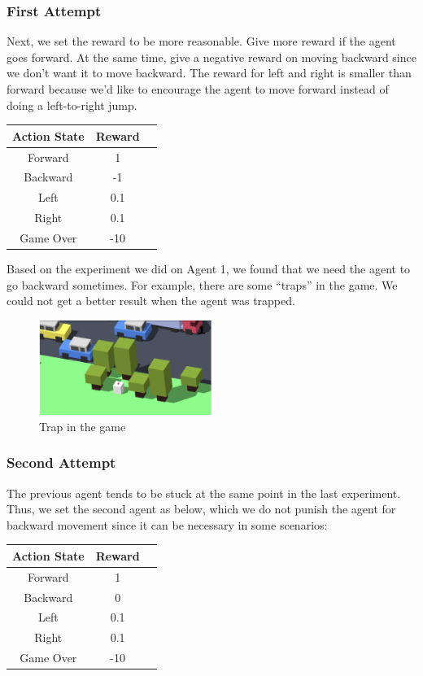 \documentclass{article}
\begin{document}
\subsubsection{First Attempt}
Next, we set the reward to be more reasonable. Give more reward if the agent goes forward. At the same time, give a negative reward on moving backward since we don’t want it to move backward. The reward for left and right is smaller than forward because we’d like to encourage the agent to move forward instead of doing a left-to-right jump.

\begin{center}
\begin{tabular}{ | c | c| c | } 
\hline
Action State & Reward\\ 
\hline
Forward & 1\\ 
\hline
Backward & -1\\ 
\hline
Left & 0.1\\ 
\hline
Right & 0.1\\ 
\hline
Game Over & -10\\ 
\hline
\end{tabular}
\end{center}

Based on the experiment we did on Agent 1, we found that we need the agent to go backward sometimes. For example, there are some “traps” in the game. We could not get a better result when the agent was trapped.

\begin{figure}[h]
\caption{Trap in the game}
\centering
\includegraphics[width=0.5\textwidth]{trap.png}
\end{figure}

\subsubsection{Second Attempt}
The previous agent tends to be stuck at the same point in the last experiment. Thus, we set the second agent as below, which we do not punish the agent for backward movement since it can be necessary in some scenarios:

\begin{center}
\begin{tabular}{ | c | c| c | } 
\hline
Action State & Reward\\ 
\hline
Forward & 1\\ 
\hline
Backward & 0\\ 
\hline
Left & 0.1\\ 
\hline
Right & 0.1\\ 
\hline
Game Over & -10\\ 
\hline
\end{tabular}
\end{center}
\end{document}
